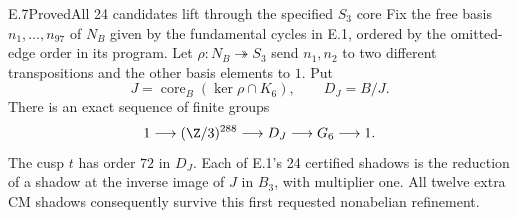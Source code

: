 \begin{statement}{E.7}{Proved}{All 24 candidates lift through the specified $S_3$ core}
Fix the free basis $n_1,\ldots,n_{97}$ of $N_B$ given by the
fundamental cycles in E.1, ordered by the omitted-edge order in its
program. Let $\rho:N_B\twoheadrightarrow S_3$ send $n_1,n_2$ to
two different transpositions and the other basis elements to $1$.
Put
\[
 J=\operatorname{core}_B(\ker\rho\cap K_6),
 \qquad D_J=B/J.
\]
There is an exact sequence of finite groups
\[
 1\longrightarrow (\Z/3)^{288}\longrightarrow D_J
       \longrightarrow G_6\longrightarrow1.
\]
The cusp $t$ has order $72$ in $D_J$. Each of E.1's 24 certified
shadows is the reduction of a shadow at the inverse image of $J$ in
$B_3$, with multiplier one. All twelve extra CM shadows consequently
survive this first requested nonabelian refinement.
\end{statement}
